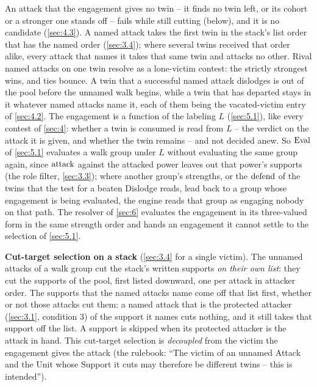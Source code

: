 \documentclass[12pt,a4paper]{article}
\begin{document}
An attack that the engagement gives no twin -- it finds no twin left, or its cohort or a stronger one stands off -- fails while still cutting (below), and it is no candidate (\cref{sec:4.3}).
A named attack takes the first twin in the stack's list order that has the named order (\cref{sec:3.4}); where several twins received that order alike, every attack that names it takes that same twin and attacks no other.
Rival named attacks on one twin resolve as a lone-victim contest: the strictly strongest wins, and ties bounce.
A twin that a successful named attack dislodges is out of the pool before the unnamed walk begins, while a twin that has departed stays in it whatever named attacks name it, each of them being the vacated-victim entry of \cref{sec:4.2}.
The engagement is a function of the labeling $L$ (\cref{sec:5.1}), like every contest of \cref{sec:4}: whether a twin is consumed is read from $L$ -- the verdict on the attack it is given, and whether the twin remains -- and not decided anew.
So $\operatorname{Eval}$ of \cref{sec:5.1} evaluates a walk group under $L$ without evaluating the same group again, since $\operatorname{attack}$ against the attacked power leaves out that power's supports (the role filter, \cref{sec:3.3}); where another group's strengths, or the $\operatorname{defend}$ of the twins that the test for a beaten Dislodge reads, lead back to a group whose engagement is being evaluated, the engine reads that group as engaging nobody on that path.
The resolver of \cref{sec:6} evaluates the engagement in its three-valued form in the same strength order and hands an engagement it cannot settle to the selection of \cref{sec:5.1}.

\textbf{Cut-target selection on a stack} (\cref{sec:3.4} for a single victim).
The unnamed attacks of a walk group cut the stack's written supports \emph{on their own list}: they cut the supports of the pool, first listed downward, one per attack in attacker order.
The supports that the named attacks name come off that list first, whether or not those attacks cut them: a named attack that is the protected attacker (\cref{sec:3.1}, condition 3) of the support it names cuts nothing, and it still takes that support off the list.
A support is skipped when its protected attacker is the attack in hand.
This cut-target selection is \emph{decoupled} from the victim the engagement gives the attack (the rulebook: ``The victim of an unnamed Attack and the Unit whose Support it cuts may therefore be different twins -- this is intended'').
\end{document}
